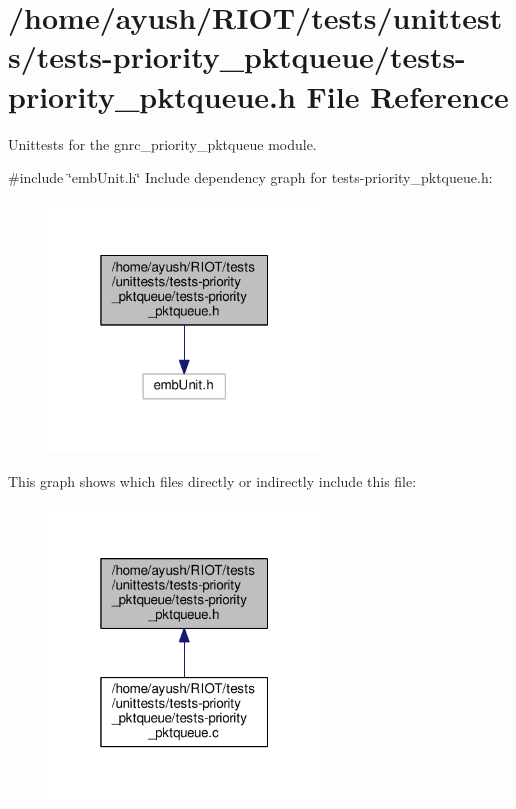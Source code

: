 \hypertarget{tests-priority__pktqueue_8h}{}\section{/home/ayush/\+R\+I\+O\+T/tests/unittests/tests-\/priority\+\_\+pktqueue/tests-\/priority\+\_\+pktqueue.h File Reference}
\label{tests-priority__pktqueue_8h}


Unittests for the {\ttfamily gnrc\+\_\+priority\+\_\+pktqueue} module.  


{\ttfamily \#include \char`\"{}emb\+Unit.\+h\char`\"{}}\newline
Include dependency graph for tests-\/priority\+\_\+pktqueue.h\+:
\nopagebreak
\begin{figure}[H]
\begin{center}
\leavevmode
\includegraphics[width=205pt]{tests-priority__pktqueue_8h__incl}
\end{center}
\end{figure}
This graph shows which files directly or indirectly include this file\+:
\nopagebreak
\begin{figure}[H]
\begin{center}
\leavevmode
\includegraphics[width=205pt]{tests-priority__pktqueue_8h__dep__incl}
\end{center}
\end{figure}
